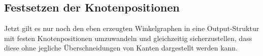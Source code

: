 \subsection{Festsetzen der Knotenpositionen}
Jetzt gilt es nur noch den eben erzeugten Winkelgraphen in eine Output-Struktur mit festen Knotenpositionen umzuwandeln und gleichzeitig sicherzustellen,
dass diese ohne jegliche Überschneidungen von Kanten dargestellt werden kann.
